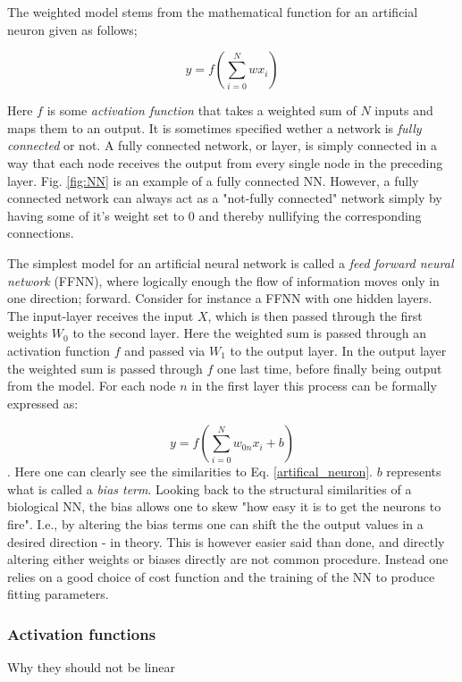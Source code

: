 The weighted model stems from the mathematical function for an artificial neuron given as follows; 

\begin{equation}\label{artifical_neuron}
    y = f\left( \sum_{i=0}^Nwx_i \right) 
\end{equation}

Here $f$ is some \textit{activation function} that takes a weighted sum of $N$ inputs and maps them to an output. 
It is sometimes specified wether a network is \textit{fully connected} or not. A fully connected network, or layer, is simply connected in a way that each node receives the output from every single node in the preceding layer. Fig. \ref{fig:NN} is an example of a fully connected NN. However, a fully connected network can always act as a "not-fully connected" network simply by having some of it's weight set to $0$ and thereby nullifying the corresponding connections. 

The simplest model for an artificial neural network is called a \textit{feed forward neural network} (FFNN), where logically enough the flow of information moves only in one direction; forward. Consider for instance a FFNN with one hidden layers. The input-layer receives the input $X$, which is then passed through the first weights $W_0$ to the second layer. Here the weighted sum is passed through an activation function $f$ and passed via $W_1$ to the output layer. In the output layer the weighted sum is passed through $f$ one last time, before finally being output from the model. For each node $n$ in the first layer this process can be formally expressed as:


\begin{equation}
    y = f\left( \sum_{i=0}^N w_{0n}x_i + b\right)
\end{equation}
\citep[p.17]{Ketkar2017}. Here one can clearly see the similarities to Eq. \ref{artifical_neuron}. $b$ represents what is called a \textit{bias term}. Looking back to the structural similarities of a biological NN, the bias allows one to skew "how easy it is to get the neurons to fire". I.e., by altering the bias terms one can shift the the output values in a desired direction - in theory. This is however easier said than done, and directly altering either weights or biases directly are not common procedure. Instead one relies on a good choice of cost function and the training of the NN to produce fitting parameters. 

\subsubsection{Activation functions}
Why they should not be linear

